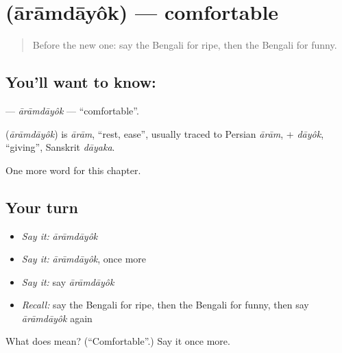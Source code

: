 \section[\texorpdfstring{\bn{আরামদায়ক} (ārāmdāyôk)}{আরামদায়ক (ārāmdāyôk)}]{ (ārāmdāyôk) — comfortable}

\label{lesson:BN-C141-aramdayok}



\begin{quote}
Before the new one: say the Bengali for ripe, then the Bengali for funny.
\end{quote}

\subsection*{You'll want to know: }
\textbf{} — \emph{ārāmdāyôk} — \textquotedblleft{}comfortable\textquotedblright{}.

\begin{cousinweb}
\textbf{} (\emph{ārāmdāyôk}) is \emph{ārām}, \textquotedblleft{}rest, ease\textquotedblright{}, usually traced to Persian \emph{ārām}, + \emph{dāyôk}, \textquotedblleft{}giving\textquotedblright{}, Sanskrit \emph{dāyaka}.
\end{cousinweb}

\begin{grammarlens}[title={What you've built}]
One more word for this chapter.
\end{grammarlens}

\subsection*{Your turn}
\begin{itemize}
\raggedright
  \item \emph{Say it:} \emph{ārāmdāyôk}
  \item \emph{Say it:} \emph{ārāmdāyôk}, once more
  \item \emph{Say it:} say \emph{ārāmdāyôk}
  \item \emph{Recall:} say the Bengali for ripe, then the Bengali for funny, then say \emph{ārāmdāyôk} again
\end{itemize}

\begin{tcolorbox}[breakable,colback=teal!4,colframe=teal!35!black,title={Before you move on}]
What does  mean? (\textquotedblleft{}Comfortable\textquotedblright{}.) Say it once more.
\end{tcolorbox}

